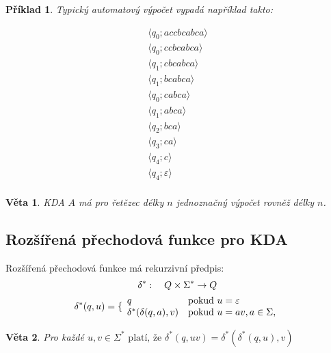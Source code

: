 \documentclass[10pt, a4paper, titlepage]{article}
\theoremstyle{note}
\newtheorem{veta}{Věta}
\newtheorem{priklad}{Příklad}
\begin{document}
\newpage
\begin{priklad}
Typický automatový výpočet vypadá například takto:

\begin{gather*}
\langle q_0 ; accbcabca \rangle \\
\langle q_0 ; ccbcabca \rangle \\
\langle q_1 ; cbcabca \rangle \\
\langle q_1 ; bcabca \rangle \\
\langle q_0 ; cabca \rangle \\
\langle q_1 ; abca \rangle \\
\langle q_2 ; bca \rangle \\
\langle q_3 ; ca \rangle \\
\langle q_4 ; c \rangle \\
\langle q_4 ; \varepsilon \rangle \\
\end{gather*}
\end{priklad}

\begin{veta}
KDA $A$ má pro řetězec délky $n$ jednoznačný výpočet rovněž délky $n$.
\end{veta}

\subsection{Rozšířená přechodová funkce pro KDA}

Rozšířená přechodová funkce má rekurzivní předpis:
\begin{gather*}
\delta^*:\quad Q \times \Sigma^* \rightarrow Q \\
\delta^*(q, u) = \lbrace
\begin{array}{l l}
q & \text{pokud } u = \varepsilon \\
\delta^*(\delta(q, a), v) & \text{pokud } u = av, a \in \Sigma, 
\end{array}
\end{gather*}

\begin{veta}\label{veta-kdaaa}
Pro každé $u,v \in \Sigma^* \text{ platí, že } \delta^*(q, uv) = \delta^*(\delta^*(q, u), v)$
\end{veta}
\end{document}
